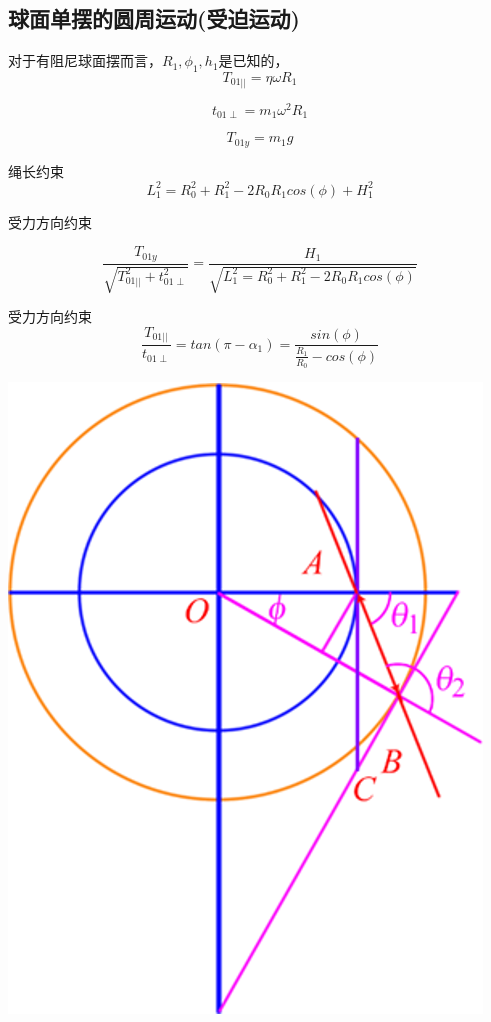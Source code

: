 \documentclass[12pt,a4paper]{ctexart}
\begin{document}
	\subsection{球面单摆的圆周运动(受迫运动)}
	\begin{minipage}[b]{0.65\linewidth}
		对于有阻尼球面摆而言，$R_1,\phi_1,h_1$是已知的，
		$$T_{01||}=\eta \omega R_1$$
		
		$$t_{01\perp}=m_1 \omega^2 R_1$$
		
		$$T_{01y}=m_1g$$
		
		绳长约束$$L_1^2=R_0^2+R_1^2-2R_0R_1cos(\phi)+H_1^2$$
		
		受力方向约束
		
		$$\frac{T_{01y}}{\sqrt{T_{01||}^2+t_{01\perp}^2}}=\frac{H_1}{\sqrt{L_1^2=R_0^2+R_1^2-2R_0R_1cos(\phi)}}$$
		
		受力方向约束
		$$\frac{T_{01||}}{t_{01\perp}}=tan(\pi-\alpha_1)=\frac{sin(\phi)}{\frac{R_1}{R_0}-cos(\phi)}$$
	\end{minipage}
	\hfill
	\begin{minipage}[b]{0.35\linewidth}
		\includegraphics[height=8\baselineskip]{T44.png}
	\end{minipage}
\end{document}

